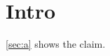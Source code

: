 \documentclass{article}
\begin{document}
\section{Intro}\label{sec:a}

\autoref{sec:a} shows the claim.
\end{document}
